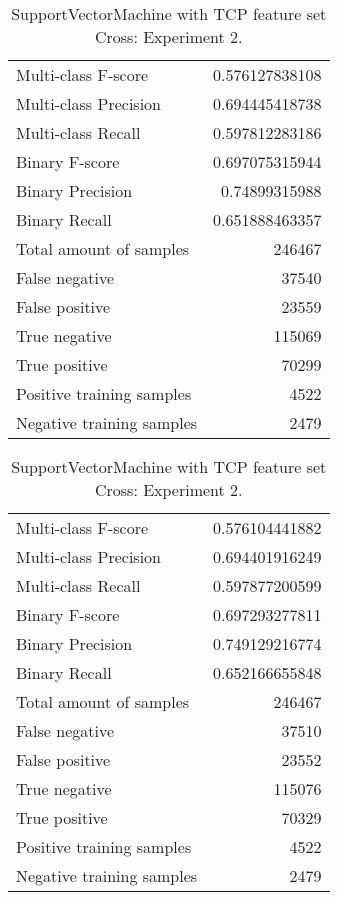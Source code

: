 \begin{table}[H]
\begin{minipage}{0.5\textwidth}
\caption{SupportVectorMachine with TCP feature set Cross: Experiment 1.}
\centering
\begin{tabular}{l r}
\toprule
Multi-class F-score & 0.576127838108 \\
Multi-class Precision & 0.694445418738 \\
Multi-class Recall & 0.597812283186 \\
\midrule
Binary F-score & 0.697075315944 \\
Binary Precision & 0.74899315988 \\
Binary Recall & 0.651888463357 \\
\midrule
Total amount of samples & 246467 \\
False negative & 37540 \\
False positive & 23559 \\
True negative & 115069 \\
True positive & 70299 \\
\midrule
Positive training samples & 4522 \\
Negative training samples & 2479 \\
\bottomrule
\end{tabular}
\end{minipage}
\hfillx
\begin{minipage}{0.5\textwidth}
\caption{SupportVectorMachine with TCP feature set Cross: Experiment 2.}
\centering
\begin{tabular}{l r}
\toprule
Multi-class F-score & 0.576104441882 \\
Multi-class Precision & 0.694401916249 \\
Multi-class Recall & 0.597877200599 \\
\midrule
Binary F-score & 0.697293277811 \\
Binary Precision & 0.749129216774 \\
Binary Recall & 0.652166655848 \\
\midrule
Total amount of samples & 246467 \\
False negative & 37510 \\
False positive & 23552 \\
True negative & 115076 \\
True positive & 70329 \\
\midrule
Positive training samples & 4522 \\
Negative training samples & 2479 \\
\bottomrule
\end{tabular}
\end{minipage}
\end{table}
